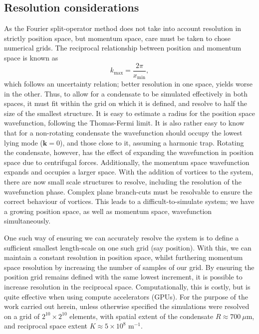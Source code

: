 \subsection{Resolution considerations}
As the Fourier split-operator method does not take into account resolution in strictly position space, but momentum space, care must be taken to chose numerical grids. The reciprocal relationship between position and momentum space is known as \begin{equation}
    k_{\text{max}} = \frac{2\pi}{x_{\text{min}}},
\end{equation}
which follows an uncertainty relation; better resolution in one space, yields worse in the other. Thus, to allow for a condensate to be simulated effectively in both spaces, it must fit within the grid on which it is defined, and resolve to half the size of the smallest structure. It is easy to estimate a radius for the position space wavefunction, following the Thomas-Fermi limit. It is also rather easy to know that for a non-rotating condensate the wavefunction should occupy the lowest lying mode ($\mathbf{k}=0$), and those close to it, assuming a harmonic trap. Rotating the condensate, however, has the effect of expanding the wavefunction in position space due to centrifugal forces. Additionally, the momentum space wavefunction expands and occupies a larger space. With the addition of vortices to the system, there are now small scale structures to resolve, including the resolution of the wavefunction phase. Complex plane branch-cuts must be resolvable to ensure the correct behaviour of vortices. This leads to a difficult-to-simulate system; we have a growing position space, as well as momentum space, wavefunction simultaneously.

One such way of ensuring we can accurately resolve the system is to define a sufficient smallest length-scale on one such grid (say position). With this, we can maintain a constant resolution in position space, whilst furthering momentum space resolution by increasing the number of samples of our grid. By ensuring the position grid remains defined with the same lowest increment, it is possible to increase resolution in the reciprocal space. Computationally, this is costly, but is quite effective when using compute accelerators (GPUs). For the purpose of the work carried out herein, unless otherwise specified the simulations were resolved on a grid of $2^{10}\times 2^{10}$ elements, with spatial extent of the condensate $R\approx 700~\mu$m, and reciprocal space extent $K \approx 5\times10^{8}$ m$^{-1}$.

